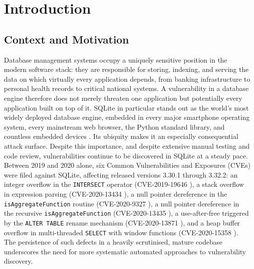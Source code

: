 \chapter{Introduction}

\section{Context and Motivation}

Database management systems occupy a uniquely sensitive position in the modern software stack: they are responsible for storing, indexing, and serving the data on which virtually every application depends, from banking infrastructure to personal health records to critical national systems. A vulnerability in a database engine therefore does not merely threaten one application but potentially every application built on top of it. SQLite in particular stands out as the world's most widely deployed database engine, embedded in every major smartphone operating system, every mainstream web browser, the Python standard library, and countless embedded devices \cite{sqlite}. Its ubiquity makes it an especially consequential attack surface. Despite this importance, and despite extensive manual testing and code review, vulnerabilities continue to be discovered in SQLite at a steady pace. Between 2019 and 2020 alone, six Common Vulnerabilities and Exposures (CVEs) were filed against SQLite, affecting released versions 3.30.1 through 3.32.2: an integer overflow in the \texttt{INTERSECT} operator (CVE-2019-19646 \cite{cve201919646}), a stack overflow in expression parsing (CVE-2020-13434 \cite{cve202013434}), a null pointer dereference in the \texttt{isAggregateFunction} routine (CVE-2020-9327 \cite{cve20209327}), a null pointer dereference in the recursive \texttt{isAggregateFunction} (CVE-2020-13435 \cite{cve202013435}), a use-after-free triggered by the \texttt{ALTER TABLE} rename mechanism (CVE-2020-13871 \cite{cve202013871}), and a heap buffer overflow in multi-threaded \texttt{SELECT} with window functions (CVE-2020-15358 \cite{cve202015358}). The persistence of such defects in a heavily scrutinised, mature codebase underscores the need for more systematic automated approaches to vulnerability discovery.

